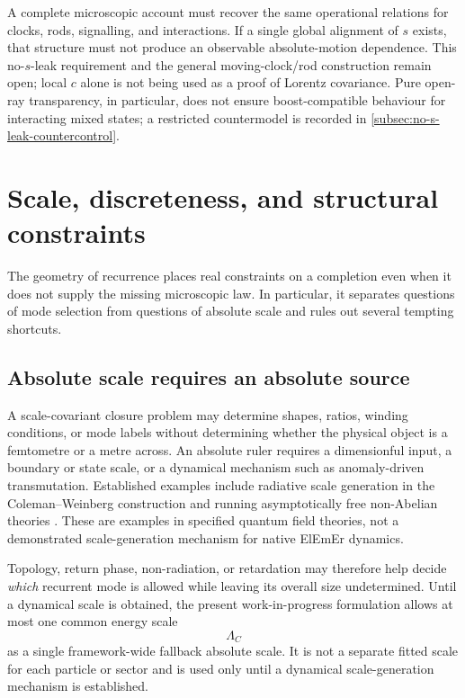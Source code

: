 \documentclass[11pt]{article}
\theoremstyle{definition}
\newcommand{\ElEmEr}{\mbox{ElEmEr}}
\begin{document}
A complete microscopic account must recover the same operational relations for clocks,
rods, signalling, and interactions.  If a single global alignment of $s$ exists, that
structure must not produce an observable absolute-motion dependence.  This no-$s$-leak
requirement and the general moving-clock/rod construction remain open; local $c$ alone is
not being used as a proof of Lorentz covariance.  Pure open-ray
transparency, in particular, does not ensure boost-compatible behaviour
for interacting mixed states; a restricted countermodel is recorded in
\cref{subsec:no-s-leak-countercontrol}.
\section{Scale, discreteness, and structural constraints}
\label{sec:constraints}

The geometry of recurrence places real constraints on a completion even when it does not
supply the missing microscopic law.  In particular, it separates questions of mode
selection from questions of absolute scale and rules out several tempting shortcuts.

\subsection{Absolute scale requires an absolute source}
\label{subsec:scale_source}

A scale-covariant closure problem may determine shapes, ratios, winding conditions, or
mode labels without determining whether the physical object is a femtometre or a metre
across.  An absolute ruler requires a dimensionful input, a boundary or state scale, or a
dynamical mechanism such as anomaly-driven transmutation.  Established examples
include radiative scale generation in the Coleman--Weinberg construction \cite{ColemanWeinberg1973}
and running asymptotically free non-Abelian theories
\cite{GrossWilczek1973,Politzer1973}.  These are examples in specified quantum
field theories, not a demonstrated scale-generation mechanism for native
\ElEmEr{} dynamics.

Topology, return phase, non-radiation, or retardation may therefore help decide
\emph{which} recurrent mode is allowed while leaving its overall size undetermined.  Until
a dynamical scale is obtained, the present work-in-progress formulation allows at most one common energy scale
\begin{equation}
\boxed{\Lambda_C}
\end{equation}
as a single framework-wide fallback absolute scale.  It is not a separate fitted scale
for each particle or sector and is used only until a dynamical scale-generation mechanism
is established.
\end{document}
